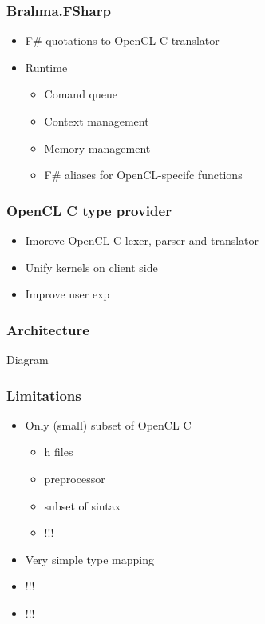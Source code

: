 \documentclass[xcolor=table]{beamer}
\begin{document}
\begin{frame}[fragile]
  \transwipe[direction=90]
  \frametitle{Brahma.FSharp}
  \begin{itemize}
  \item F\# quotations to OpenCL C translator
  \item Runtime
      \begin{itemize}
        \item Comand queue
        \item Context management
        \item Memory management
        \item F\# aliases for OpenCL-specifc functions
      \end{itemize}

  \end{itemize}
\end{frame}

\begin{frame}
  \transwipe[direction=90]
  \frametitle{OpenCL C type provider}
\begin{itemize}
\item Imorove OpenCL C lexer, parser and  translator
\item Unify kernels on client side
\item Improve user exp
\end{itemize}

\end{frame}
            
\begin{frame}
  \transwipe[direction=90]
  \frametitle{Architecture}
  Diagram
\end{frame}

\begin{frame}
  \transwipe[direction=90]
  \frametitle{Limitations }
\begin{itemize}
\item Only (small) subset of OpenCL C
 \begin{itemize}
 \item h files
 \item preprocessor
 \item subset of sintax
 \item !!!
 \end{itemize}
\item Very simple type mapping
\item !!!
\item !!!
\end{itemize}

\end{frame}
\end{document}
